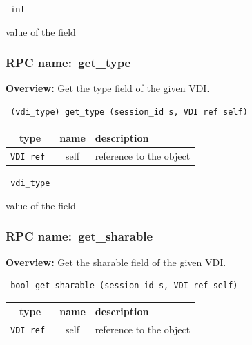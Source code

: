 \vspace{0.3cm}

{\tt 
int
}


value of the field
\vspace{0.3cm}
\vspace{0.3cm}
\vspace{0.3cm}
\subsubsection{RPC name:~get\_type}

{\bf Overview:} 
Get the type field of the given VDI.

\begin{verbatim} (vdi_type) get_type (session_id s, VDI ref self)\end{verbatim}



 
\vspace{0.3cm}
\begin{tabular}{|c|c|p{7cm}|}
 \hline
{\bf type} & {\bf name} & {\bf description} \\ \hline
{\tt VDI ref } & self & reference to the object \\ \hline 

\end{tabular}

\vspace{0.3cm}

{\tt 
vdi\_type
}


value of the field
\vspace{0.3cm}
\vspace{0.3cm}
\vspace{0.3cm}
\subsubsection{RPC name:~get\_sharable}

{\bf Overview:} 
Get the sharable field of the given VDI.

\begin{verbatim} bool get_sharable (session_id s, VDI ref self)\end{verbatim}



 
\vspace{0.3cm}
\begin{tabular}{|c|c|p{7cm}|}
 \hline
{\bf type} & {\bf name} & {\bf description} \\ \hline
{\tt VDI ref } & self & reference to the object \\ \hline 

\end{tabular}

